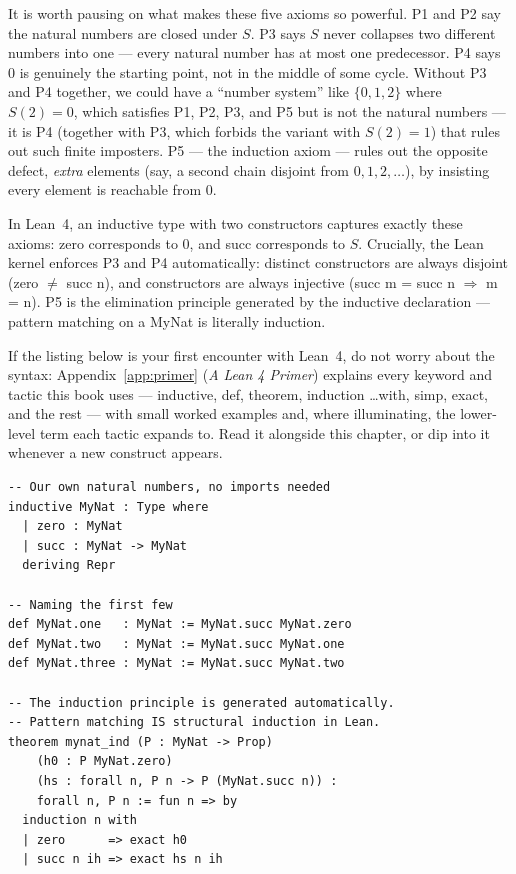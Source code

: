 \documentclass[12pt, openany]{book}
\theoremstyle{plain}
\theoremstyle{definition}
\theoremstyle{remark}
\newcommand{\li}[1]{{\ttfamily\small\color{tealaccent}#1}}
\begin{document}
It is worth pausing on what makes these five axioms so powerful.  P1 and P2 say the natural numbers are closed under $S$.  P3 says $S$ never collapses two different numbers into one --- every natural number has at most one predecessor.  P4 says $0$ is genuinely the starting point, not in the middle of some cycle.  Without P3 and P4 together, we could have a ``number system'' like $\{0, 1, 2\}$ where $S(2) = 0$, which satisfies P1, P2, P3, and P5 but is not the natural numbers --- it is P4 (together with P3, which forbids the variant with $S(2) = 1$) that rules out such finite imposters.  P5 --- the induction axiom --- rules out the opposite defect, \emph{extra} elements (say, a second chain disjoint from $0, 1, 2, \ldots$), by insisting every element is reachable from $0$.

In Lean~4, an inductive type with two constructors captures exactly these axioms: \li{zero} corresponds to $0$, and \li{succ} corresponds to $S$.  Crucially, the Lean kernel enforces P3 and P4 automatically: distinct constructors are always disjoint (\li{zero} $\neq$ \li{succ n}), and constructors are always injective (\li{succ m = succ n} $\Rightarrow$ \li{m = n}).  P5 is the elimination principle generated by the \li{inductive} declaration --- pattern matching on a \li{MyNat} is literally induction.

If the listing below is your first encounter with Lean~4, do not worry about the syntax: Appendix~\ref{app:primer} (\emph{A Lean 4 Primer}) explains every keyword and tactic this book uses --- \li{inductive}, \li{def}, \li{theorem}, \li{induction \ldots with}, \li{simp}, \li{exact}, and the rest --- with small worked examples and, where illuminating, the lower-level term each tactic expands to.  Read it alongside this chapter, or dip into it whenever a new construct appears.

\begin{leanbox}
\begin{lstlisting}
-- Our own natural numbers, no imports needed
inductive MyNat : Type where
  | zero : MyNat
  | succ : MyNat -> MyNat
  deriving Repr

-- Naming the first few
def MyNat.one   : MyNat := MyNat.succ MyNat.zero
def MyNat.two   : MyNat := MyNat.succ MyNat.one
def MyNat.three : MyNat := MyNat.succ MyNat.two

-- The induction principle is generated automatically.
-- Pattern matching IS structural induction in Lean.
theorem mynat_ind (P : MyNat -> Prop)
    (h0 : P MyNat.zero)
    (hs : forall n, P n -> P (MyNat.succ n)) :
    forall n, P n := fun n => by
  induction n with
  | zero      => exact h0
  | succ n ih => exact hs n ih
\end{lstlisting}
\end{leanbox}
\color{black}
\end{document}
